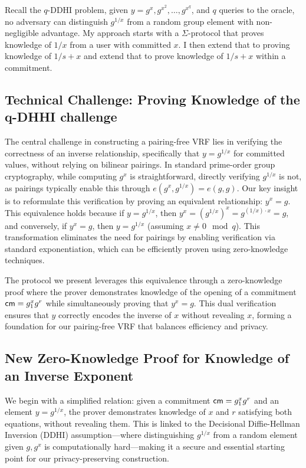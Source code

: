 Recall the $q$-DDHI problem, given $y = g^x, g^{x^2}, \ldots, g^{x^q}$, and $q$ queries to the oracle, no adversary can distinguish $g^{1/x}$ from a random group element with non-negligible advantage. My approach starts with a $\Sigma$-protocol that proves knowledge of $1/x$ from a user with committed $x$. I then extend that to proving knowledge of $1/s+x$ and extend that to prove knowledge of $1/s+x$ within a commitment. 

\subsection{Technical Challenge: Proving Knowledge of the q-DHHI challenge}

The central challenge in constructing a pairing-free VRF lies in verifying the correctness of an inverse relationship, specifically that $y = g^{1/x}$ for committed values, without relying on bilinear pairings. In standard prime-order group cryptography, while computing $g^x$ is straightforward, directly verifying $g^{1/x}$ is not, as pairings typically enable this through $e(g^x, g^{1/x}) = e(g,g)$. Our key insight is to reformulate this verification by proving an equivalent relationship: $y^x = g$. This equivalence holds because if $y = g^{1/x}$, then $y^x = (g^{1/x})^x = g^{(1/x) \cdot x} = g$, and conversely, if $y^x = g$, then $y = g^{1/x}$ (assuming $x \neq 0 \mod q$). This transformation eliminates the need for pairings by enabling verification via standard exponentiation, which can be efficiently proven using zero-knowledge techniques.

The protocol we present leverages this equivalence through a zero-knowledge proof where the prover demonstrates knowledge of the opening of a commitment $\mathsf{cm} = g_1^x g^r$ while simultaneously proving that $y^x = g$. This dual verification ensures that $y$ correctly encodes the inverse of $x$ without revealing $x$, forming a foundation for our pairing-free VRF that balances efficiency and privacy.

\subsection{New Zero-Knowledge Proof for Knowledge of an Inverse Exponent}

We begin with a simplified relation: given a commitment $\mathsf{cm} = g_1^x g^r$ and an element $y = g^{1/x}$, the prover demonstrates knowledge of $x$ and $r$ satisfying both equations, without revealing them. This is linked to the Decisional Diffie-Hellman Inversion (DDHI) assumption—where distinguishing $g^{1/x}$ from a random element given $g, g^x$ is computationally hard—making it a secure and essential starting point for our privacy-preserving construction.


